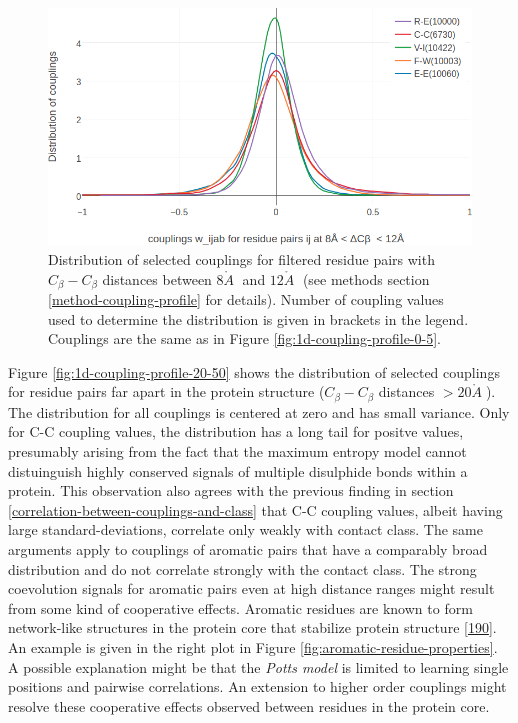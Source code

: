 \documentclass[11pt,a4paper,twoside]{book}
\newcommand{\Cb}{C_\beta}
\newcommand{\angstrom}{\mathring{A} \;}
\theoremstyle{definition}
\theoremstyle{definition}
\theoremstyle{remark}
\begin{document}
\begin{figure}
\includegraphics[width=1\linewidth]{img/coupling_matrix_analysis/1d_coupling_profile_8_12} \caption{Distribution of selected
couplings for filtered residue pairs with \(\Cb-\Cb\) distances between
\(8\angstrom\) and \(12 \angstrom\) (see methods section
\ref{method-coupling-profile} for details). Number of coupling values
used to determine the distribution is given in brackets in the legend.
Couplings are the same as in Figure \ref{fig:1d-coupling-profile-0-5}.}\label{fig:1d-coupling-profile-8-12}
\end{figure}

Figure \ref{fig:1d-coupling-profile-20-50} shows the distribution of
selected couplings for residue pairs far apart in the protein structure
(\(\Cb-\Cb\) distances \(> 20\angstrom\)).\\
The distribution for all couplings is centered at zero and has small
variance. Only for C-C coupling values, the distribution has a long tail
for positve values, presumably arising from the fact that the maximum
entropy model cannot distuinguish highly conserved signals of multiple
disulphide bonds within a protein. This observation also agrees with the
previous finding in section
\ref{correlation-between-couplings-and-class} that C-C coupling values,
albeit having large standard-deviations, correlate only weakly with
contact class. The same arguments apply to couplings of aromatic pairs
that have a comparably broad distribution and do not correlate strongly
with the contact class. The strong coevolution signals for aromatic
pairs even at high distance ranges might result from some kind of
cooperative effects. Aromatic residues are known to form network-like
structures in the protein core that stabilize protein structure
{[}\protect\hyperlink{ref-Burley1985}{190}{]}. An example is given in
the right plot in Figure \ref{fig:aromatic-residue-properties}. A
possible explanation might be that the \emph{Potts model} is limited to
learning single positions and pairwise correlations. An extension to
higher order couplings might resolve these cooperative effects observed
between residues in the protein core.
\end{document}

